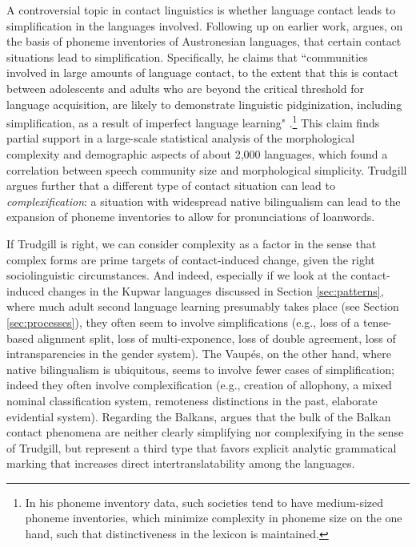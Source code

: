 \documentclass[output=paper]{langscibook}
\begin{document}
\noindent A controversial topic in contact linguistics is whether language contact leads to simplification in the languages involved. 
Following up on earlier work, \textcite{trudgill2004linguistic} argues, on the basis of phoneme inventories of Austronesian languages, that certain contact situations lead to simplification. Specifically, he claims that ``communities involved in large amounts of language contact, to the extent that this is contact between adolescents and adults who are beyond the critical threshold for language acquisition, are likely to demonstrate linguistic pidginization, including simplification, as a result of imperfect language learning" \parencite[306]{trudgill2004linguistic}.\footnote{In his phoneme inventory data, such societies tend to have medium-sized phoneme inventories, which minimize complexity in phoneme size on the one hand, such that distinctiveness in the lexicon is maintained.} This claim finds partial support in a large-scale statistical analysis of the morphological complexity and demographic aspects \parencite{lupyanetal2010language} of about 2,000 languages, which found a correlation between speech community size and morphological simplicity. Trudgill argues further that a different type of contact situation can lead to \textit{complexification}: a situation with widespread native bilingualism can lead to the expansion of phoneme inventories to allow for pronunciations of loanwords.

If Trudgill is right, we can consider complexity as a factor in the sense that complex forms are prime targets of contact-induced change, given the right sociolinguistic circumstances. And indeed, especially if we look at the contact-induced changes in the Kupwar languages discussed in Section \ref{sec:patterns}, where much adult second language learning presumably takes place (see Section \ref{sec:processes}), they often seem to involve simplifications (e.g., loss of a tense-based alignment split, loss of multi-exponence, loss of double agreement, loss of intransparencies in the gender system). The Vaupés, on the other hand, where native bilingualism is ubiquitous, seems to involve fewer cases of simplification; indeed they often involve complexification (e.g., creation of allophony, a mixed nominal classification system, remoteness distinctions in the past, elaborate evidential system). Regarding the Balkans, \textcite{lindstedt2018} argues that the bulk of the Balkan contact phenomena are neither clearly simplifying nor complexifying in the sense of Trudgill, but represent a third type that favors explicit analytic grammatical marking that increases direct intertranslatability among the languages.
\end{document}
